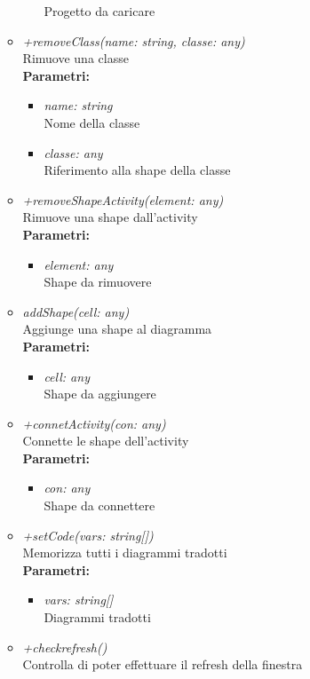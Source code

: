 \begin{itemize}
\begin{itemize}
\begin{itemize}
    			Progetto da caricare
    		\end{itemize}
    		\item \emph{+removeClass(name: string, classe: any)}\\
    		Rimuove una classe\\
    		\textbf{Parametri:}
    		\begin{itemize}
    			\item \emph{name: string}\\
    			Nome della classe
    			\item \emph{classe: any}\\
    			Riferimento alla shape della classe
    		\end{itemize}
    		\item \emph{+removeShapeActivity(element: any)}\\
    		Rimuove una shape dall'activity\\
    		\textbf{Parametri:}
    		\begin{itemize}
    			\item \emph{element: any}\\
    			Shape da rimuovere
    		\end{itemize}
    		\item \emph{addShape(cell: any)}\\
    		Aggiunge una shape al diagramma\\
    		\textbf{Parametri:}
    		\begin{itemize}
    			\item \emph{cell: any}\\
    			Shape da aggiungere
    		\end{itemize}
    		\item \emph{+connetActivity(con: any)}\\
    		Connette le shape dell'activity\\
    		\textbf{Parametri:}
    		\begin{itemize}
    			\item \emph{con: any}\\
    			Shape da connettere
    		\end{itemize}
    		\item \emph{+setCode(vars: string[])}\\
    		Memorizza tutti i diagrammi tradotti\\
    		\textbf{Parametri:}
    		\begin{itemize}
    			\item \emph{vars: string[]}\\
    			Diagrammi tradotti
    		\end{itemize}
    		\item \emph{+checkrefresh()}\\
    		Controlla di poter effettuare il refresh della finestra
		\end{itemize}
\end{itemize}